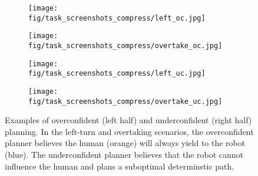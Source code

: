 \begin{figure}[htb]
    \centering
    \begin{subfigure}[t]{.24\linewidth}
    \texttt{[image: fig/task\_screenshots\_compress/left\_oc.jpg]}
    \end{subfigure}
    \begin{subfigure}[t]{.24\linewidth}
    \texttt{[image: fig/task\_screenshots\_compress/overtake\_oc.jpg]}
    \end{subfigure}
    \begin{subfigure}[t]{.24\linewidth}
    \texttt{[image: fig/task\_screenshots\_compress/left\_uc.jpg]}
    \end{subfigure}
    \begin{subfigure}[t]{.24\linewidth}
    \texttt{[image: fig/task\_screenshots\_compress/overtake\_uc.jpg]}
    \end{subfigure} %
        \caption{\small Examples of overconfident (left half) and underconfident (right half) planning. In the left-turn and overtaking scenarios, the overconfident planner believes the human (orange) will always yield to the robot (blue). The underconfident planner believes that the robot cannot influence the human and plans a suboptimal determinstic path.}\label{fig:oc_uc}
    \vspace{-10pt}
\end{figure}


